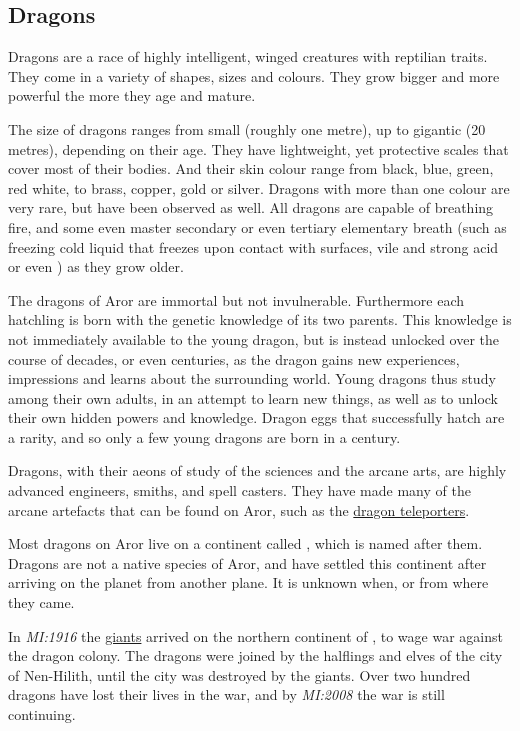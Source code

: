 \subsection{Dragons}
\label{sec:Dragons}

Dragons are a race of highly intelligent, winged creatures with reptilian
traits. They come in a variety of shapes, sizes and colours. They grow bigger
and more powerful the more they age and mature.

The size of dragons ranges from small (roughly one metre), up to gigantic (20
metres), depending on their age. They have lightweight, yet protective scales
that cover most of their bodies. And their skin colour range from black, blue,
green, red white, to brass, copper, gold or silver. Dragons with more than
one colour are very rare, but have been observed as well. All dragons are
capable of breathing fire, and some even master secondary or even tertiary
elementary breath (such as freezing cold liquid that freezes upon contact with
surfaces, vile and strong acid or even ) as they grow
older.

The dragons of Aror are immortal but not invulnerable. Furthermore each
hatchling is born with the genetic knowledge of its two parents. This knowledge
is not immediately available to the young dragon, but is instead unlocked
over the course of decades, or even centuries, as the dragon gains new
experiences, impressions and learns about the surrounding world. Young dragons
thus study among their own adults, in an attempt to learn new things, as well as
to unlock their own hidden powers and knowledge. Dragon eggs that successfully
hatch are a rarity, and so only a few young dragons are born in a century.

Dragons, with their aeons of study of the sciences and the arcane arts, are
highly advanced engineers, smiths, and spell casters. They have made many of
the arcane artefacts that can be found on Aror, such as the
\hyperref[sec:Dragon Teleporter]{dragon teleporters}.

Most dragons on Aror live on a continent called , which
is named after them. Dragons are not a native species of Aror, and have settled
this continent after arriving on the planet from another plane. It is unknown
when, or from where they came.

In \emph{MI:1916} the \hyperref[sec:Giants]{giants} arrived on the northern
continent of , to wage war against the dragon colony. The
dragons were joined by the halflings and elves of the city of Nen-Hilith,
until the city was destroyed by the giants. Over two hundred dragons have lost
their lives in the war, and by \emph{MI:2008} the war is still continuing.

